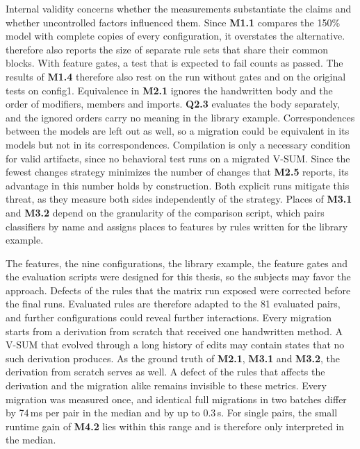 Internal validity concerns whether the measurements substantiate the claims and whether uncontrolled factors influenced them.
Since \textbf{M1.1} compares the 150\% model with complete copies of every configuration, it overstates the alternative.
 therefore also reports the size of separate rule sets that share their common blocks.
With feature gates, a test that is expected to fail counts as passed.
The results of \textbf{M1.4} therefore also rest on the run without gates and on the original tests on config1.
Equivalence in \textbf{M2.1} ignores the handwritten body and the order of modifiers, members and imports.
\textbf{Q2.3} evaluates the body separately, and the ignored orders carry no meaning in the library example.
Correspondences between the models are left out as well, so a migration could be equivalent in its models but not in its correspondences.
Compilation is only a necessary condition for valid artifacts, since no behavioral test runs on a migrated V-SUM.
Since the fewest changes strategy minimizes the number of changes that \textbf{M2.5} reports, its advantage in this number holds by construction.
Both explicit runs mitigate this threat, as they measure both sides independently of the strategy.
Places of \textbf{M3.1} and \textbf{M3.2} depend on the granularity of the comparison script, which pairs classifiers by name and assigns places to features by rules written for the library example.

The features, the nine configurations, the library example, the feature gates and the evaluation scripts were designed for this thesis, so the subjects may favor the approach.
Defects of the rules that the matrix run exposed were corrected before the final runs.
Evaluated rules are therefore adapted to the 81 evaluated pairs, and further configurations could reveal further interactions.
Every migration starts from a derivation from scratch that received one handwritten method.
A V-SUM that evolved through a long history of edits may contain states that no such derivation produces.
As the ground truth of \textbf{M2.1}, \textbf{M3.1} and \textbf{M3.2}, the derivation from scratch serves as well.
A defect of the rules that affects the derivation and the migration alike remains invisible to these metrics.
Every migration was measured once, and identical full migrations in two batches differ by 74\,ms per pair in the median and by up to 0.3\,s.
For single pairs, the small runtime gain of \textbf{M4.2} lies within this range and is therefore only interpreted in the median.


